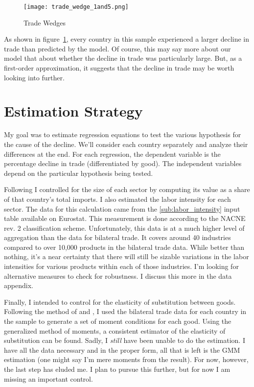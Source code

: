 \documentclass[11pt]{article}
\begin{document}
  \begin{figure} \label{fig:trade_wedge}
    \centering
      \texttt{[image: trade\_wedge\_1and5.png]}
    \caption{Trade Wedges}
  \end{figure}

  As shown in figure~\ref{fig:trade_wedge}, every country in this sample experienced a larger decline in trade than predicted by the model.  Of course, this may say more about our model that about whether the decline in trade was particularly large.  But, as a first-order approximation, it suggests that the decline in trade may be worth looking into further.

\section{Estimation Strategy} %
\label{sec:estimation_strategy}
  My goal was to estimate regression equations to test the various hypothesis for the cause of the decline.  We'll consider each country separately and analyze their differences at the end.  For each regression, the dependent variable is the percentage decline in trade (differentiated by good).  The independent variables depend on the particular hypothesis being tested.

  Following \cite{llt:2010} I controlled for the size of each sector by computing its value as a share of that country's total imports. I also estimated the labor intensity for each sector.  The data for this calculation came from the \ref{sub:labor_intensity} input table available on Eurostat.  This measurement is done according to the NACNE rev. 2 classification scheme.  Unfortunately, this data is at a much higher level of aggregation than the data for bilateral trade.  It covers around 40 industries compared to over 10,000 products in the bilateral trade data.  While better than nothing, it's a near certainty that there will still be sizable variations in the labor intensities for various products within each of those industries.  I'm looking for alternative measures to check for robustness.  I discuss this more in the data appendix.

  Finally, I intended to control for the elasticity of substitution between goods.  Following the method of \cite{weinstein-broda:2004} and \cite{feenstra:1994}, I used the bilateral trade data for each country in the sample to generate a set of moment conditions for each good.  Using the generalized method of moments, a consistent estimator of the elasticity of substitution can be found. Sadly, I \emph{still} have been unable to do the estimation.  I have all the data necessary and in the proper form, all that is left is the GMM estimation (one might say I'm mere moments from the result).  For now, however, the last step has eluded me. I plan to pursue this further, but for now I am missing an important control.
\end{document}
